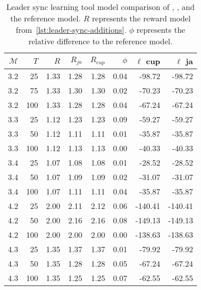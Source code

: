 \begin{table}
    \centering
    \caption{Leader sync learning tool model comparison of \Cupaal, \Jajapy, and the reference model. $R$ represents the reward model from~\autoref{lst:leader-sync-additions}. $\phi$ represents the relative difference to the reference model.}
    \label{tab:leader-results-accuracy}
    \begin{tabular}{rrrrrrrr}
        \toprule
        $\mathcal{M}$ & $T$ & $R$  & $R_{ja}$ & $R_{cup}$ & $\phi$ & $\ell$ cup & $\ell$ ja \\
        \midrule
        3.2           & 25  & 1.33 & 1.28     & 1.28      & 0.04   & -98.72     & -98.72    \\
        3.2           & 75  & 1.33 & 1.30     & 1.30      & 0.02   & -70.23     & -70.23    \\
        3.2           & 100 & 1.33 & 1.28     & 1.28      & 0.04   & -67.24     & -67.24    \\
        3.3           & 25  & 1.12 & 1.23     & 1.23      & 0.09   & -59.27     & -59.27    \\
        3.3           & 50  & 1.12 & 1.11     & 1.11      & 0.01   & -35.87     & -35.87    \\
        3.3           & 100 & 1.12 & 1.13     & 1.13      & 0.00   & -40.33     & -40.33    \\
        3.4           & 25  & 1.07 & 1.08     & 1.08      & 0.01   & -28.52     & -28.52    \\
        3.4           & 50  & 1.07 & 1.09     & 1.09      & 0.02   & -31.07     & -31.07    \\
        3.4           & 100 & 1.07 & 1.11     & 1.11      & 0.04   & -35.87     & -35.87    \\
        4.2           & 25  & 2.00 & 2.11     & 2.12      & 0.06   & -140.41    & -140.41   \\
        4.2           & 50  & 2.00 & 2.16     & 2.16      & 0.08   & -149.13    & -149.13   \\
        4.2           & 100 & 2.00 & 2.00     & 2.00      & 0.00   & -138.63    & -138.63   \\
        4.3           & 25  & 1.35 & 1.37     & 1.37      & 0.01   & -79.92     & -79.92    \\
        4.3           & 50  & 1.35 & 1.28     & 1.28      & 0.05   & -67.24     & -67.24    \\
        4.3           & 100 & 1.35 & 1.25     & 1.25      & 0.07   & -62.55     & -62.55    \\

\end{tabular}
\end{table}
